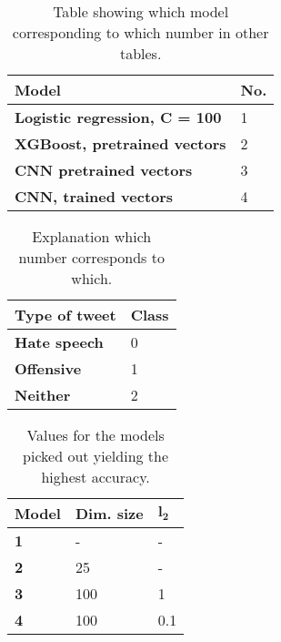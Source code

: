 \documentclass[twocolumn]{article}
\begin{document}
\begin{table}[]

\begin{tabular}{|l|l|}
\hline
\textbf{Model}                        & \textbf{No.} \\ \hline
\textbf{Logistic regression, C = 100} & 1            \\ \hline
\textbf{XGBoost, pretrained vectors}   & 2            \\ \hline
\textbf{CNN pretrained vectors}       & 3            \\ \hline
\textbf{CNN, trained vectors}         & 4            \\ \hline
\end{tabular}
\caption{Table showing which model corresponding to which number in other tables.}
\label{tab:explain-models}
\end{table}


\begin{table}[]

\begin{tabular}{|l|l|}
\hline
 \textbf{Type of tweet}                                     & \textbf{Class} \\ \hline
\textbf{Hate speech}                 & 0               \\ \hline
\textbf{Offensive} & 1               \\ \hline
\textbf{Neither}                   & 2               \\ \hline
\end{tabular}
\caption{Explanation which number corresponds to which. }
\label{tab:explan-class}
\end{table}

\begin{table}[]

\begin{tabular}{|l|l|l|}
\hline
\textbf{Model}                          & \textbf{Dim. size} & $\mathbf{l_2}$ \\ \hline
\textbf{1}   & -            & -     \\ \hline
\textbf{2}     & 25           & -     \\ \hline
\textbf{3}         & 100          & 1     \\ \hline
\textbf{4} & 100          & 0.1   \\ \hline
\end{tabular}
\caption{Values for the models picked out yielding the highest accuracy. }
\label{tab:model-settings}
\end{table}
\end{document}
